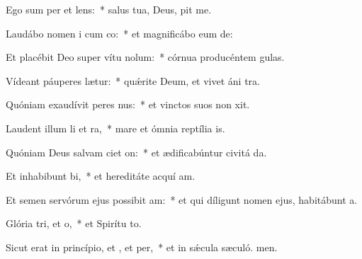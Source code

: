 \item Ego sum per et lens:~* salus tua, Deus, pit me.
\item Laudábo nomen i cum co:~* et magnificábo eum  de:
\item Et placébit Deo super vítu nolum:~* córnua producéntem  gulas.
\item Vídeant páuperes  lætur:~* quǽrite Deum, et vivet áni tra.
\item Quóniam exaudívit peres nus:~* et vinctos suos non xit.
\item Laudent illum li et ra,~* mare et ómnia reptília  is.
\item Quóniam Deus salvam ciet on:~* et ædificabúntur civitá da.
\item Et inhabibunt bi,~* et hereditáte acquí am.
\item Et semen servórum ejus possibit am:~* et qui díligunt nomen ejus, habitábunt  a.
\item Glória tri, et o,~* et Spirítu to.
\item Sicut erat in princípio, et , et per,~* et in sǽcula sæculó. men.
